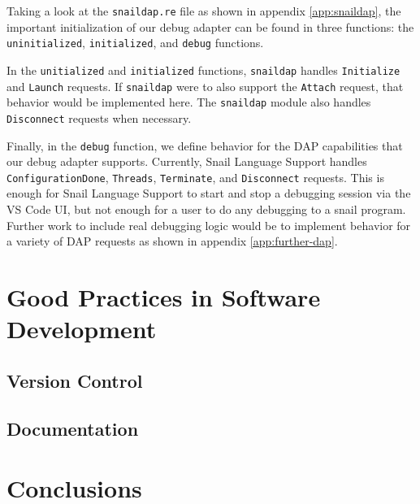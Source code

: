\documentclass{article}
\begin{document}
Taking a look at the \lstinline{snaildap.re} file as shown in appendix \ref{app:snaildap}, the important initialization of our debug adapter can be found in three functions: the \lstinline{uninitialized}, \lstinline{initialized}, and \lstinline{debug} functions. 

In the \lstinline{unitialized} and \lstinline{initialized} functions, \lstinline{snaildap} handles \lstinline{Initialize} and \lstinline{Launch} requests. If \lstinline{snaildap} were to also support the \lstinline{Attach} request, that behavior would be implemented here. The \lstinline{snaildap} module also handles \lstinline{Disconnect} requests when necessary. 

Finally, in the \lstinline{debug} function, we define behavior for the DAP capabilities that our debug adapter supports. Currently, Snail Language Support handles \lstinline{ConfigurationDone}, \lstinline{Threads}, \lstinline{Terminate}, and \lstinline{Disconnect} requests. This is enough for Snail Language Support to start and stop a debugging session via the VS Code UI, but not enough for a user to do any debugging to a snail program. Further work to include real debugging logic would be to implement behavior for a variety of DAP requests as shown in appendix \ref{app:further-dap}. 

\section{Good Practices in Software Development}

\subsection{Version Control}

\subsection{Documentation}

\section{Conclusions}

\newpage




\newpage
\end{document}
